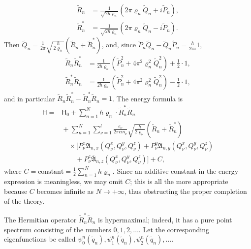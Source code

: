 \documentclass[fontsize=13pt,twoside,openany,headings=normal,parskip=false,bookmarkpackage=false,DIV=calc]{scrbook}
\begin{document}
\begin{align*}
 \widetilde R_n&=\frac1{\sqrt{2h\varrho_n}}(2\pi\varrho_n\widetilde Q_n+i\widetilde P_n),\\
 \widetilde R_n^*&=\frac1{\sqrt{2h\varrho_n}}(2\pi\varrho_n\widetilde Q_n-i\widetilde P_n).
\end{align*}
Then $\widetilde Q_n=\frac1{2\pi}\sqrt{\frac{h}{2\varrho_n}}(\widetilde R_n+\widetilde R_n^*)$, and, since $\widetilde P_n\widetilde Q_n-\widetilde Q_n\widetilde P_n=\frac{h}{2\pi i}1$,
\begin{align*}
 \widetilde R_n\widetilde R_n^*
 &=\frac1{2h\varrho_n}(\widetilde P_n^2+4\pi^2\varrho_n^2\widetilde Q_n^2)+\tfrac12\cdot1,\\
 \widetilde R_n^*\widetilde R_n
 &=\frac1{2h\varrho_n}(\widetilde P_n^2+4\pi^2\varrho_n^2\widetilde Q_n^2)-\tfrac12\cdot1,
\end{align*}
and in particular $\widetilde R_n\widetilde R_n^*-\widetilde R_n^*\widetilde R_n=1$. The energy formula is
\begin{align*}
 \mathsf{H}={}&\mathsf{H}_0+\sum_{n=1}^{N}h\varrho_n\cdot\widetilde R_n^*\widetilde R_n\\
 &{}+\sum_{n=1}^{N}\sum_{\nu=1}^{l}\frac{e_\nu}{2\pi cm_\nu}
 \sqrt{\frac{h}{2\varrho_\nu}}(\widetilde R_n+\widetilde R_n^*)\\
 &\quad{}\times\bigl[P_\nu^x\overline{\mathfrak A}_{n,x}(Q_\nu^x,Q_\nu^y,Q_\nu^z)
 +P_\nu^y\overline{\mathfrak A}_{n,y}(Q_\nu^x,Q_\nu^y,Q_\nu^z)\\
 &\qquad{}+P_\nu^z\overline{\mathfrak A}_{n,z}(Q_\nu^x,Q_\nu^y,Q_\nu^z)\bigr]+C,
\end{align*}
where $C=\text{constant}=\frac12\sum_{n=1}^{N}h\varrho_n$. Since an additive constant in the energy expression is meaningless, we may omit $C$; this is all the more appropriate because $C$ becomes infinite as $N\longrightarrow+\infty$, thus obstructing the proper completion of the theory.

\hypertarget{origpage-142}{}%
The Hermitian operator $\widetilde R_n^*\widetilde R_n$ is hypermaximal; indeed, it has a pure point spectrum consisting of the numbers $0,1,2,\ldots$. Let the corresponding eigenfunctions be called $\psi_0^n(\widetilde q_n),\psi_1^n(\widetilde q_n),\psi_2^n(\widetilde q_n),\ldots$.
\end{document}
